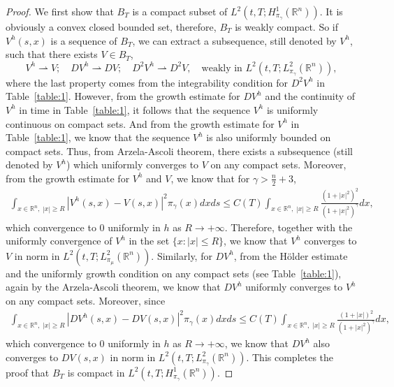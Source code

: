 \documentclass[11pt]{article}
\numberwithin{equation}{section}
\newcommand{\brn}{{\mathbb{R}^n}}
\newcommand{\1}{\mbox{1\hspace{-1mm}I}}
\begin{document}
\begin{proof}
We first show that $B_{T}$ is a compact subset of $L^{2}\left(t,T;H_{\pi_{\gamma}}^{1}(\brn)\right)$. It is obviously a convex closed bounded set, therefore, $B_{T}$ is weakly compact. So if $V^{h}(s,x)$ is a sequence of $B_{T}$, we can extract a subsequence, still denoted by $V^{h}$, such that there exists $V\in B_T$,
\begin{equation*}\label{eq:5-121}
    V^{h}\rightharpoonup V;\quad DV^{h}\rightharpoonup DV;\quad D^{2}V^{h}\rightharpoonup D^{2}V,\quad \text{weakly in } L^{2}(t,T;L_{\pi_{\gamma}}^{2}(\brn)),
\end{equation*}
where the last property comes from the integrability condition for $D^2V^h$ in Table~\ref{table:1}. However, from the growth estimate for $DV^h$ and the continuity of $V^h$ in time in Table~\ref{table:1}, it follows that the sequence $V^{h}$ is uniformly continuous on compact sets. And from the growth estimate for $V^h$ in Table~\ref{table:1}, we know that the sequence $V^{h}$ is also uniformly bounded on compact sets. Thus, from Arzela-Ascoli theorem, there exists a subsequence (still denoted by $V^{h}$) which uniformly converges to $V$ on any compact sets. Moreover, from the growth estimate for $V^h$ and $V$, we know that for $\gamma>\frac{n}{2}+3$,
\begin{align*}
    \int_{x\in\brn,\;|x|\geq R} \left|V^{h}(s,x)-V(s,x)\right|^{2}\pi_{\gamma}(x)dxds \le C(T)\int_{x\in\brn,\;|x|\geq R} \frac{\left(1+|x|^2\right)^2}{\left(1+|x|^2\right)^\gamma} dx,
\end{align*}
which convergence to $0$ uniformly in $h$ as $R\to+\infty$. Therefore, together with the uniformly convergence of $V^{h}$ in the set $\{x:|x|\le R\}$,  we know that $V^{h}$ converges to $V$ in norm in $L^{2}(t,T;L_{\pi_{\mu}}^{2}(\brn))$. Similarly, for $DV^h$, from the H\"older estimate and the uniformly growth condition on any compact sets (see Table~\ref{table:1}), again by the Arzela-Ascoli theorem, we know that $DV^h$ uniformly converges to $V^h$ on any compact sets. Moreover, since
\begin{align*}
    \int_{x\in\brn,\;|x|\geq R} \left|DV^{h}(s,x)-DV(s,x)\right|^{2}\pi_{\gamma}(x)dxds \le C(T)\int_{x\in\brn,\;|x|\geq R} \frac{\left(1+|x|\right)^2}{\left(1+|x|^2\right)^\gamma} dx,
\end{align*}
which convergence to $0$ uniformly in $h$ as $R\to+\infty$, we know that $DV^{h}$ also converges to $ DV(s,x)$ in norm in $L^{2}(t,T;L_{\pi_{\gamma}}^{2}(\brn))$. This completes the proof that $B_{T}$ is compact in $L^{2}(t,T;H_{\pi_{\gamma}}^{1}(\brn))$. 


\end{proof}
\end{document}
